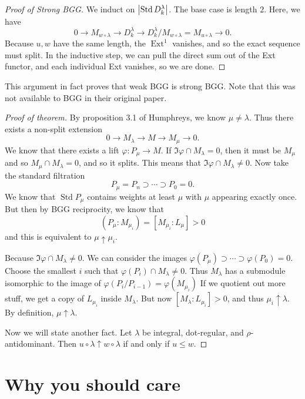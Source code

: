 \documentclass[leqno, openany]{memoir}
\theoremstyle{definition}
\theoremstyle{remark}
\theoremstyle{plain}
\theoremstyle{definition}
\theoremstyle{remark}
\newcommand{\on}[1]{\operatorname{#1}}
\DeclareMathOperator{\Ext}{Ext}
\begin{document}
\begin{proof}[Proof of Strong BGG]
    We induct on $\abs{\on{Std} D_k^{\lambda}}$. The base case is length $2$. Here, we have
    \[ 0 \to M_{w \circ \lambda} \to D_k^{\lambda} \to D_k^{\lambda} / M_{w \circ \lambda} = M_{u \circ \lambda} \to 0. \]
    Because $u, w$ have the same length, the $\Ext^1$ vanishes, and so the exact sequence must split. In the inductive step, we can pull the direct sum out of the Ext functor, and each individual Ext vanishes, so we are done.
\end{proof}

This argument in fact proves that weak BGG is strong BGG. Note that this was not available to BGG in their original paper.

\begin{proof}[Proof of theorem]
    By proposition 3.1 of Humphreys, we know $\mu \neq \lambda$. Thus there exists a non-split extension
    \[ 0 \to M_{\lambda} \to M \to M_{\mu} \to 0. \]
    We know that there exists a lift $\varphi \colon P_{\mu} \to M$. If $\Im \varphi \cap M_{\lambda} = 0$, then it must be $M_{\mu}$ and so $M_{\mu} \cap M_{\lambda} = 0$, and so it splits. This means that $\Im \varphi \cap M_{\lambda} \neq 0$. Now take the standard filtration
    \[ P_{\mu} = P_n \supset \cdots \supset P_0 = 0. \]
    We know that $\on{Std} P_{\mu}$ contains weights at least $\mu$ with $\mu$ appearing exactly once. But then by BGG reciprocity, we know that
    \[ (P_{\mu} : M_{\mu_i}) = [M_{\mu_i} : L_{\mu}] > 0 \]
    and this is equivalent to $\mu \uparrow \mu_i$.

    Because $\Im \varphi \cap M_{\lambda} \neq 0$. We can consider the images $\varphi(P_{\mu}) \supset \cdots \supset \varphi(P_0) = 0$. Choose the smallest $i$ such that $\varphi(P_i) \cap M_{\lambda} \neq 0$. Thus $M_{\lambda}$ has a submodule isomorphic to the image of $\varphi(P_i / P_{i-1}) = \varphi(M_{\mu_i})$ If we quotient out more stuff, we get a copy of $L_{\mu_i}$ inside $M_{\lambda}$. But now $[M_{\lambda} : L_{\mu_i}] > 0$, and thus $\mu_i \uparrow \lambda$. By definition, $\mu \uparrow \lambda$.

    Now we will state another fact. Let $\lambda$ be integral, dot-regular, and $\rho$-antidominant. Then $u \circ \lambda \uparrow w \circ \lambda$ if and only if $u \leq w$.
\end{proof}

\section{Why you should care}%
\label{sec:why_you_should_care}
\end{document}
